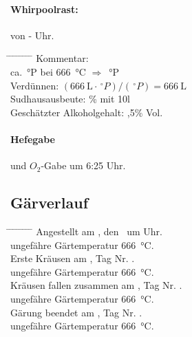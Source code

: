 \documentclass[12pt,oneside,a4paper]{scrartcl}
\begin{document}
\paragraph{Whirpoolrast:} von - Uhr.
	\begin{tabbing}
		\hspace{1cm} \= \hspace{1cm} \= \hspace{1cm} \= \hspace{1cm} \= \hspace{1cm} \= \hspace{1cm} \= \hspace{1cm} \= \hspace{1cm} \= \kill
		\> Kommentar: \>\>\>  \\
		\> \> \> ca. \,°P \> \> bei \> \SI{666}{\celsius} \> $\Rightarrow$ \> \,°P\\
		\> \> Verdünnen: \> \> \> \> \> $(\SI{666}{\liter} \cdot \,^\circ P)/(\,^\circ P)= \SI{666}{\liter}$\\
		\> \> Sudhausausbeute: \> \> \> \> \% mit 10l\\
		\> \> Geschätzter Alkoholgehalt: \> \> \> \> ,5\% Vol.
	\end{tabbing}
%
\paragraph{Hefegabe} und $O_2$-Gabe um 6:25 Uhr.
%
\subsection*{Gärverlauf}
	\begin{tabbing}
		\hspace{1cm} \= \hspace{1cm} \= \hspace{1cm} \= \hspace{1cm} \= \hspace{1cm} \= \hspace{1cm} \= \hspace{1cm} \= \hspace{1cm} \= \kill
		\> Angestellt am , den  \ um  Uhr.\\
		\> \> ungefähre Gärtemperatur \SI{666}{\celsius}.\\
		\> Erste Kräusen am \hspace{4cm}, Tag Nr.\hspace{2.5cm} .\\
		\> \> ungefähre Gärtemperatur \SI{666}{\celsius}.\\
		\> Kräusen fallen zusammen am \hspace{4cm}, Tag Nr. \hspace{2.5cm}.\\
		\> \> ungefähre Gärtemperatur \SI{666}{\celsius}.\\
		\> Gärung beendet am \hspace{4cm}, Tag Nr. \hspace{2.5cm}.\\
		\> \> ungefähre Gärtemperatur \SI{666}{\celsius}.
	\end{tabbing}
%
\end{document}
